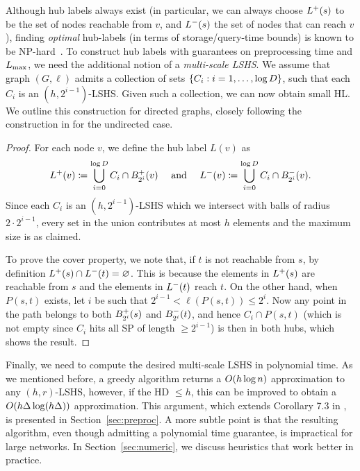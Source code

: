 Although hub labels always exist (in particular, we can always choose $\Lf(s)$ to be the set of nodes reachable from $v$, and $\Lb(s)$ the set of nodes that can reach $v$), finding \emph{optimal} hub-labels (in terms of storage/query-time bounds) is known to be NP-hard~\cite{babenko_hl_complexity}.
To construct hub labels with guarantees on preprocessing time and $\Lm$, we need the additional notion of a \emph{multi-scale LSHS}. 
We assume that graph $(G,\ell)$ admits a collection of sets $\crl*{C_i: i=1,\ldots,\log D}$, such that each $C_i$ is an $(h,2^{i-1})$-LSHS.
Given such a collection, we can now obtain small HL.
We outline this construction for directed graphs, closely following the construction in \cite[Theorem 5.1]{highway2013} for the undirected case.
\begin{proof}
For each node $v$, we define the hub label $L(v)$ as
\[
\Lf(v)\defeq  \bigcup_{i=0}^{\log D}C_i\cap \Bf_{2^i}(v) \quad\text{ and }\quad
\Lb(v)\defeq \bigcup_{i=0}^{\log D}C_i\cap \Bb_{2^i}(v).
\]
Since each $C_i$ is an $(h,2^{i-1})$-LSHS which we intersect with balls of radius $2\cdot 2^{i-1}$, every set in the union contributes at most $h$ elements and the maximum size is as claimed.

To prove the cover property, we note that, if $t$ is not reachable from $s$, by definition $\Lf(s)\cap\Lb(t)=\varnothing$.
This is because the elements in $\Lf(s)$ are reachable from $s$ and the elements in $\Lb(t)$ reach $t$.
On the other hand, when $P(s,t)$ exists, let $i$ be such that $2^{i-1}<\ell(P(s,t))\leq 2^i$.
Now any point in the path belongs to both $\Bf_{2^i}(s)$ and $\Bb_{2^i}(t)$, and hence $C_i\cap P(s,t)$  (which is not empty since $C_i$ hits all SP of length $\geq 2^{i-1}$) is then in both hubs, which shows the result.
\end{proof}


Finally, we need to compute the desired multi-scale LSHS in polynomial time.
As we mentioned before, a greedy algorithm returns a $\Or(h\log n)$ approximation to any $(h,r)$-LSHS, however, if the HD $\leq h$, this can be improved to obtain a $\Or(h\Delta\log(h\Delta))$ approximation.
This argument, which extends Corollary 7.3 in \cite{highway2013}, is presented in Section~\ref{sec:preproc}.
A more subtle point is that the resulting algorithm, even though admitting a polynomial time guarantee, is impractical for large networks.
In Section~\ref{sec:numeric}, we discuss heuristics that work better in practice.